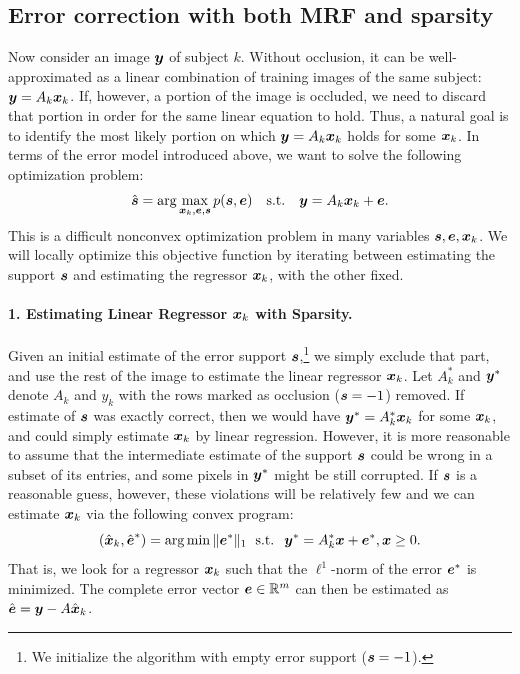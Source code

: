 \subsection{Error correction with both MRF and sparsity}
Now consider an image ${\boldsymbol{y}}$ of subject $k$. Without occlusion, it can be well-approximated as a linear combination of training images of the same subject: ${\boldsymbol{y}} = A_k {\boldsymbol{x}}_k$. If, however, a portion of the image is occluded, we need to discard that portion in order for the same linear equation to hold. Thus, a natural goal is to identify the most likely portion  on which ${\boldsymbol{y}} = A_k {\boldsymbol{x}}_k$ holds for some ${\boldsymbol{x}}_k$. In terms of the error model introduced above, we want to solve the following optimization problem:
\begin{equation}
\hat {\boldsymbol{s}} = \mbox{arg}\max_{{\boldsymbol{x}}_k,\boldsymbol{e},\boldsymbol{s}} p(\boldsymbol{s}, \boldsymbol{e}) \quad \mbox{s.t.} \quad {\boldsymbol{y}} = A_k {\boldsymbol{x}}_k + \boldsymbol{e}.
\end{equation}
This is a difficult nonconvex optimization problem in many variables $\boldsymbol{s}, \boldsymbol{e}, {\boldsymbol{x}}_k$. We will locally optimize this objective function by iterating between estimating the support $\boldsymbol{s}$ and estimating the regressor ${\boldsymbol{x}}_k$, with the other fixed.

\paragraph{1. Estimating Linear Regressor ${\boldsymbol{x}}_k$ with Sparsity.}
Given an initial estimate of the error support $\boldsymbol{s}$,\footnote{We initialize the algorithm with empty error support ($\boldsymbol{s} = -1$).} we simply exclude that part, and use the rest of the image to estimate the linear regressor ${\boldsymbol{x}}_k$. Let $A_k^*$ and ${\boldsymbol{y}}^*$ denote $A_k$ and $y_k$ with the rows marked as occlusion ($\boldsymbol{s} = -1$) removed.
If estimate of $\boldsymbol{s}$ was exactly correct, then we would have ${\boldsymbol{y}}^* = A_k^* {\boldsymbol{x}}_k$ for some ${\boldsymbol{x}}_k$, and could simply estimate ${\boldsymbol{x}}_k$ by linear regression. However, it is more reasonable to assume that the intermediate estimate of the support $\boldsymbol{s}$ could be wrong in a subset of its entries, and some pixels in ${\boldsymbol{y}}^*$ might be still corrupted. If $\boldsymbol{s}$ is a reasonable guess, however, these violations will be relatively few and we can estimate ${\boldsymbol{x}}_k$ via the following convex program:
\begin{equation}
(\hat{{\boldsymbol{x}}}_k,\hat{\boldsymbol{e}}^*) = \arg\min \|\boldsymbol{e}^*\|_1  \; \textup{ s.t. } \; {\boldsymbol{y}}^* = A_k^*{\boldsymbol{x}}+\boldsymbol{e}^*, {\boldsymbol{x}}\geq
0.
\end{equation}
That is, we look for a regressor ${\boldsymbol{x}}_k$ such that the $\ell^1$-norm of the error $\boldsymbol{e}^*$ is minimized. The complete error vector $\boldsymbol{e} \in \mathbb R^m$ can then be estimated as $\hat {\boldsymbol{e}} = {\boldsymbol{y}} - A \hat{{\boldsymbol{x}}}_k$.

